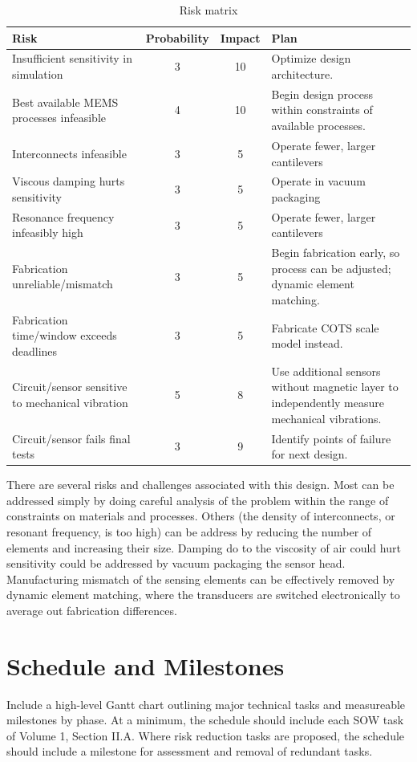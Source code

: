 \begin{table}[h!]
\centering
\begin{tabularx}{.85\textwidth}{|X||c|c|X|}
    \hline
    Risk & Probability & Impact & Plan\\
    \hline
    \hline
    Insufficient sensitivity in simulation & 3 & 10 & Optimize design architecture. \\
    \hline
    Best available MEMS processes infeasible & 4 & 10 & Begin design process within constraints of available processes. \\
    \hline
    Interconnects infeasible & 3 & 5 & Operate fewer, larger cantilevers \\
    \hline
    Viscous damping hurts sensitivity & 3 & 5 & Operate in vacuum packaging \\
    \hline
    Resonance frequency infeasibly high & 3  & 5 & Operate fewer, larger cantilevers \\
    \hline
    Fabrication unreliable/mismatch & 3 & 5 & Begin fabrication early, so process can be adjusted; dynamic element matching. \\
    \hline
    Fabrication time/window exceeds deadlines & 3 & 5 & Fabricate COTS scale model instead. \\
    \hline
    Circuit/sensor sensitive to mechanical vibration & 5 & 8 & Use additional sensors without magnetic layer to independently measure mechanical vibrations. \\
    \hline
    Circuit/sensor fails final tests & 3 & 9 & Identify points of failure for next design. \\
    \hline
\end{tabularx}
\caption{Risk matrix}
\label{table:risk}
\end{table}

There are several risks and challenges associated with this design. Most can be addressed simply by doing careful analysis of the problem within the range of constraints on materials and processes. Others (the density of interconnects, or resonant frequency, is too high) can be address by reducing the number of elements and increasing their size. Damping do to the viscosity of air could hurt sensitivity could be addressed by vacuum packaging the sensor head. Manufacturing mismatch of the sensing elements can be effectively removed by dynamic element matching, where the transducers are switched electronically to average out fabrication differences.

\section{Schedule and Milestones}
Include a high-level Gantt chart outlining major technical tasks and measureable milestones
by phase. At a minimum, the schedule should include each SOW task of Volume 1, Section
II.A. Where risk reduction tasks are proposed, the schedule should include a milestone for
assessment and removal of redundant tasks.

